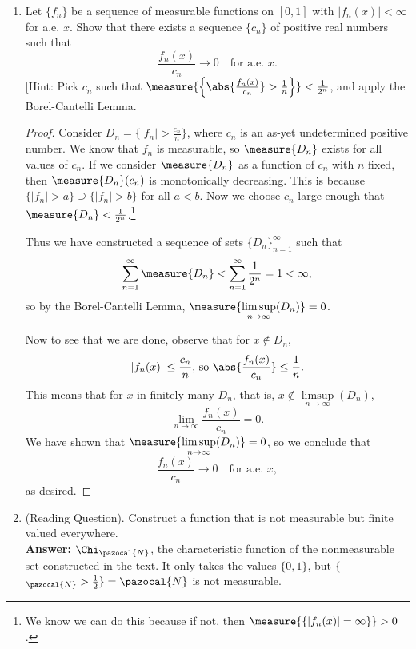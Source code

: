 \documentclass[letterpaper]{article}
\renewcommand{\mathcal}[1]{\pazocal{#1}}
\begin{document}
\begin{enumerate}
\begin{proof}
Since $\sum_{k=1}^\infty \measure{E_k}$ is a convergent sum, then for any $\epsilon>0$, there exists some $N\in\N$ such that $\sum\limits_{k\geq N} \measure{E_k}<\epsilon$.

Then for any $x\in E$, $x\in\bigcup\limits_{k\geq N}E_k$, since the union contains some $E_k$ with $k>N$ for any $x$. Now since $E \subseteq \bigcup\limits_{k\geq N}E_k$, then by sub-additivity,
$$\measure{E}\leq\sum\limits_{k\geq N} \measure{E_k}<\epsilon$$
and we are done.
\end{proof}

\item Let $\{f_n\}$ be a sequence of measurable functions on $[0,1]$ with $|f_n(x)|<\infty$ for a.e. $x$. Show that there exists a sequence $\{c_n\}$ of positive real numbers such that
$$\frac{f_n(x)}{c_n}\to0 \quad \text{for a.e. }x.$$
[Hint: Pick $c_n$ such that $\measure{\left\lbrace \abs{\frac{f_n(x)}{c_n}}>\frac{1}{n}\right\rbrace}<\frac{1}{2^n}$, and apply the Borel-Cantelli Lemma.]
\begin{proof}
Consider $D_n=\{|f_n|>\frac{c_n}{n}\}$, where $c_n$ is an as-yet undetermined positive number. We know that $f_n$ is measurable, so $\measure{D_n}$ exists for all values of $c_n$. If we consider $\measure{D_n}$ as a function of $c_n$ with $n$ fixed, then $\measure{D_n}(c_n)$ is monotonically decreasing. This is because $\{|f_n|>a\}\supseteq\{|f_n|>b\}$ for all $a<b$. Now we choose $c_n$ large enough that $\measure{D_n}<\frac{1}{2^n}$.\footnote{We know we can do this because if not, then $\measure{\{|f_n(x)|=\infty\}}>0$.}

Thus we have constructed a sequence of sets $\{D_n\}_{n=1}^\infty$ such that
$$\sum_{n=1}^\infty \measure{D_n} < \sum_{n=1}^\infty \frac{1}{2^n} = 1 < \infty,$$
so by the Borel-Cantelli Lemma, $\measure{\limsup\limits_{n\to\infty} (D_n)}=0$.

Now to see that we are done, observe that for $x\not\in D_n$,
$$|f_n(x)|\leq \frac{c_n}{n} \text{, so } \abs{\frac{f_n(x)}{c_n}}\leq\frac{1}{n}.$$
This means that for $x$ in finitely many $D_n$, that is, $x\not\in\limsup\limits_{n\to\infty} (D_n)$,
$$\lim_{n\to\infty}\frac{f_n(x)}{c_n}=0.$$
We have shown that $\measure{\limsup\limits_{n\to\infty} (D_n)}=0$, so we conclude that
$$\frac{f_n(x)}{c_n}\to0 \quad \text{for a.e. }x,$$
as desired.
\end{proof}

\item[] (Reading Question). Construct a function that is not measurable but finite valued everywhere. \\
\textbf{Answer:} $\Chi_\mathcal{N}$, the characteristic function of the nonmeasurable set constructed in the text. It only takes the values $\{0,1\}$, but $\{$\raisebox{2pt}{$\chi$}$_\mathcal{N} > \frac{1}{2}\}=\mathcal{N}$ is not measurable.

\end{enumerate}
\end{document}
